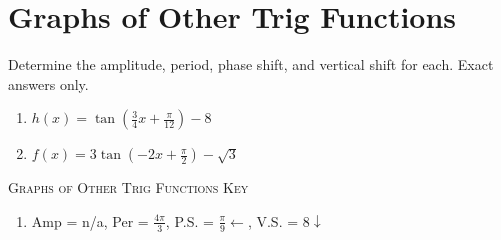\chapter{Graphs of Other Trig Functions}

Determine the amplitude, period, phase shift, and vertical shift for each. Exact answers only.

\begin{enumerate}
	\item $h(x) = \tan\left(\frac{3}{4}x + \frac{\pi}{12}\right) - 8$
	\item $f(x)=3\tan\left(-2x+\frac{\pi}{2}\right)-\sqrt{3}$
\end{enumerate}

\newpage

\textsc{Graphs of Other Trig Functions Key}

\begin{enumerate}
	\item Amp = n/a, Per = $\frac{4\pi}{3}$, P.S. = $\frac{\pi}{9} \leftarrow$, V.S. = $8 \downarrow$
\end{enumerate}